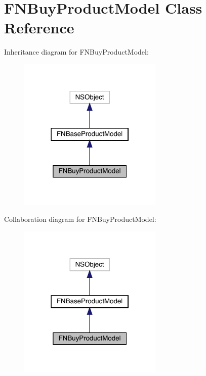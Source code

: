 \hypertarget{interface_f_n_buy_product_model}{}\section{F\+N\+Buy\+Product\+Model Class Reference}
\label{interface_f_n_buy_product_model}


Inheritance diagram for F\+N\+Buy\+Product\+Model\+:\nopagebreak
\begin{figure}[H]
\begin{center}
\leavevmode
\includegraphics[width=194pt]{interface_f_n_buy_product_model__inherit__graph}
\end{center}
\end{figure}


Collaboration diagram for F\+N\+Buy\+Product\+Model\+:\nopagebreak
\begin{figure}[H]
\begin{center}
\leavevmode
\includegraphics[width=194pt]{interface_f_n_buy_product_model__coll__graph}
\end{center}
\end{figure}
